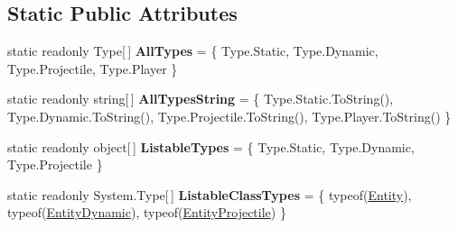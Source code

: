 \subsection*{Static Public Attributes}
\begin{DoxyCompactItemize}
\item 
\hypertarget{class_skyrates_1_1_common_1_1_entity_1_1_entity_aa2264aa396ec6c08519c50f6e872596e}{static readonly Type\mbox{[}$\,$\mbox{]} {\bfseries All\-Types} = \{ Type.\-Static, Type.\-Dynamic, Type.\-Projectile, Type.\-Player \}}\label{class_skyrates_1_1_common_1_1_entity_1_1_entity_aa2264aa396ec6c08519c50f6e872596e}

\item 
\hypertarget{class_skyrates_1_1_common_1_1_entity_1_1_entity_a824e2b260185ecccfa385b4a80eab46c}{static readonly string\mbox{[}$\,$\mbox{]} {\bfseries All\-Types\-String} = \{ Type.\-Static.\-To\-String(), Type.\-Dynamic.\-To\-String(), Type.\-Projectile.\-To\-String(), Type.\-Player.\-To\-String() \}}\label{class_skyrates_1_1_common_1_1_entity_1_1_entity_a824e2b260185ecccfa385b4a80eab46c}

\item 
\hypertarget{class_skyrates_1_1_common_1_1_entity_1_1_entity_adc830384f250e2d5f9b33229d91885ce}{static readonly object\mbox{[}$\,$\mbox{]} {\bfseries Listable\-Types} = \{ Type.\-Static, Type.\-Dynamic, Type.\-Projectile \}}\label{class_skyrates_1_1_common_1_1_entity_1_1_entity_adc830384f250e2d5f9b33229d91885ce}

\item 
\hypertarget{class_skyrates_1_1_common_1_1_entity_1_1_entity_a9abf8cce12c295b351195de009cfd007}{static readonly System.\-Type\mbox{[}$\,$\mbox{]} {\bfseries Listable\-Class\-Types} = \{ typeof(\hyperlink{class_skyrates_1_1_common_1_1_entity_1_1_entity}{Entity}), typeof(\hyperlink{class_skyrates_1_1_common_1_1_entity_1_1_entity_dynamic}{Entity\-Dynamic}), typeof(\hyperlink{class_skyrates_1_1_client_1_1_entity_1_1_entity_projectile}{Entity\-Projectile}) \}}\label{class_skyrates_1_1_common_1_1_entity_1_1_entity_a9abf8cce12c295b351195de009cfd007}

\end{DoxyCompactItemize}
